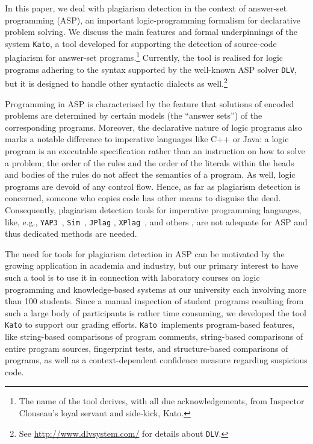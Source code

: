 \documentclass{tlp}
\newcommand{\dlv}{\texttt{DLV}\xspace}
\newcommand{\kato}[0]{\texttt{Kato}\xspace}
\begin{document}
In this paper, we deal with plagiarism detection in the context of answer-set programming (ASP), an important logic-programming formalism for declarative problem solving.
We discuss the main features and formal underpinnings of the system \kato, a tool developed for supporting the detection of source-code plagiarism for answer-set programs.\footnote{The name of the tool derives, with all due acknowledgements, from Inspector Clouseau's loyal servant and side-kick, Kato.}  
Currently, the tool is realised for logic
 programs adhering to the syntax supported by the well-known ASP solver \dlv, but it is designed to handle other syntactic dialects  as well.\footnote{See \url{http://www.dlvsystem.com/} for details about \dlv.}

Programming in ASP is characterised by the feature that solutions of encoded problems are determined by certain models (the ``answer sets'') of the corresponding programs. 
Moreover, the declarative nature of logic programs also marks a notable difference to 
imperative languages like C++ or Java: 
a logic program is an executable  specification rather than an  instruction on how to solve a problem;
the order of the rules and the order of the literals within the heads and bodies of the 
rules do not affect  the semantics of a program.
As well, logic programs are devoid of any control flow.
Hence, as far as plagiarism detection is concerned, someone who copies code has other means to 
disguise the deed.
Consequently, plagiarism detection tools for
imperative programming languages, 
like, e.g., \texttt{YAP3}~\cite{verco96}, \texttt{Sim}~\cite{gitchell-tran99}, \texttt{JPlag} \cite{prechelt-etal00}, \texttt{XPlag}~\cite{arwin06}, and others \cite{jones01}, are
not adequate for ASP and thus dedicated methods are needed.

The need for tools for plagiarism detection in ASP
can be motivated by the growing application in academia and industry, but our primary interest to have such a tool is to use it in connection with laboratory courses on logic programming and knowledge-based systems at our university each involving more than 100 students.
Since a manual inspection of student programs resulting from such a large body of participants is rather time consuming, we developed the tool \kato to support our grading efforts.
\kato\ implements program-based features, like string-based comparisons of  program comments, string-based comparisons of entire program sources, 
 fingerprint tests, and structure-based comparisons of programs, as well as
a context-dependent confidence measure regarding suspicious code.
\end{document}
